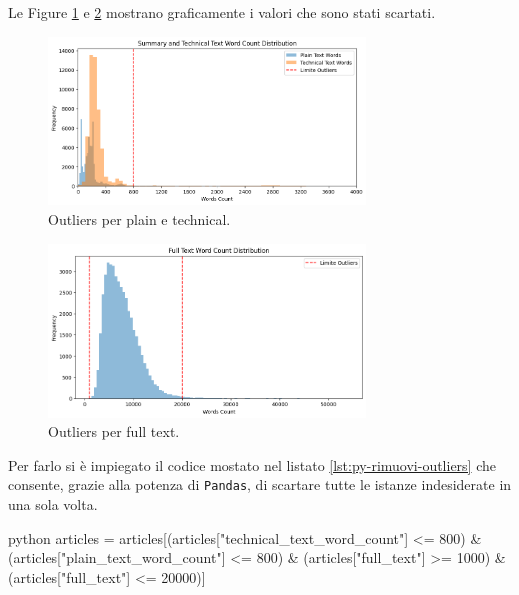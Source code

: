 \documentclass[12pt,a4paper,twoside,openright]{book}
\begin{document}
Le Figure \ref{fig:hist_tech_plain_word_outliers} e \ref{fig:hist_full_word_outliers} mostrano graficamente i valori che sono stati scartati.
\begin{figure}
    \centering
    \includegraphics[width=0.75\textwidth]{images/hist_wc_outliers.png}
    \caption{Outliers per plain e technical.}
    \label{fig:hist_tech_plain_word_outliers}
\end{figure}

\begin{figure}
    \centering
    \includegraphics[width=0.75\textwidth]{images/hist_wc_outliers_full.png}
    \caption{Outliers per full text.}
    \label{fig:hist_full_word_outliers}
\end{figure}


Per farlo si è impiegato il codice mostato nel listato \ref{lst:py-rimuovi-outliers} che consente, grazie alla potenza di \texttt{Pandas}, di scartare tutte le istanze indesiderate in una sola volta.

\begin{customcode}
\begin{mintedbox}{python}
articles = articles[(articles["technical_text_word_count"] <= 800) & 
                    (articles["plain_text_word_count"] <= 800) &
                    (articles["full_text"] >= 1000) &
                    (articles["full_text"] <= 20000)]
\end{mintedbox}
\caption{Script per rimozione outliers per numero di parole.}
\label{lst:py-rimuovi-outliers}
\end{customcode}
\end{document}
